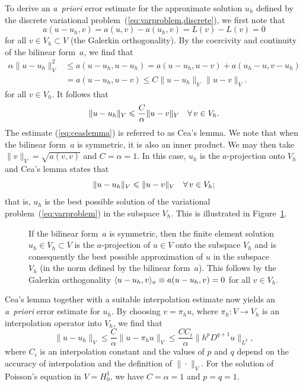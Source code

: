To derive an \emph{a~priori} error estimate for the approximate
solution $u_h$ defined by the discrete variational
problem~(\ref{eq:varproblem,discrete}), we first note that
\begin{equation}
  a(u - u_h, v) = a(u, v) - a(u_h, v) = L(v) - L(v) = 0
\end{equation}
for all $v \in V_h \subset V$ (the Galerkin orthogonality). By the
coercivity and continuity of the bilinear form~$a$, we find that
\begin{equation}
  \begin{split}
    \alpha \|u - u_h\|_V^2
    &\leqslant a(u - u_h, u - u_h)
    = a(u - u_h, u - v) + a(u_h - u, v - u_h)
    \\
    &= a(u - u_h, u - v) \leqslant C \|u - u_h\|_V \, \|u - v\|_V.
  \end{split}
\end{equation}
for all $v \in V_h$. It follows that
\begin{equation} \label{eq:ceaslemma}
  \|u - u_h\|_V
  \leqslant \frac{C}{\alpha} \|u - v\|_V \quad \forall\, v \in V_h.
\end{equation}
%
The estimate (\ref{eq:ceaslemma}) is referred to as Cea's lemma. We
note that when the bilinear form~$a$ is symmetric, it is also an inner
product. We may then take $\|v\|_V = \sqrt{a(v, v)}$ and $C = \alpha =
1$. In this case, $u_h$ is the $a$-projection onto $V_h$ and Cea's
lemma states that
\begin{equation}
  \|u - u_h\|_V \leqslant \|u - v\|_V \quad \forall\, v \in V_h;
\end{equation}
that is, $u_h$ is the best possible solution of the variational
problem~(\ref{eq:varproblem}) in the subspace $V_h$. This is
illustrated in Figure~\ref{fig:ceaslemma}.

\begin{figure}
\bwfig
  \centering
  \caption{If the bilinear form~$a$ is symmetric, then the finite
    element solution~$u_h \in V_h \subset V$ is the $a$-projection
    of $u \in V$ onto the subspace $V_h$ and is consequently the
    best possible approximation of $u$ in the subspace $V_h$ (in the
    norm defined by the bilinear form~$a$). This follows by the Galerkin orthogonality
    $\langle u - u_h, v \rangle_a \equiv a(u - u_h, v) = 0$ for all $v \in V_h$.}
  \label{fig:ceaslemma}
\end{figure}

Cea's lemma together with a suitable interpolation estimate now yields
an \emph{a~priori} error estimate for $u_h$. By choosing $v = \pi_h
u$, where $\pi_h : V \rightarrow V_h$ is an interpolation operator
into $V_h$, we find that
\begin{equation} \label{eq:apriori}
  \|u - u_h\|_V
  \leqslant \frac{C}{\alpha} \|u - \pi_h u\|_V
  \leqslant \frac{C C_i}{\alpha} \|h^p D^{q + 1} u\|_{L^2},
\end{equation}
where $C_i$ is an interpolation constant and the values of $p$ and $q$
depend on the accuracy of interpolation and the definition of
$\|\cdot\|_V$. For the solution of Poisson's equation in $V = H^1_0$,
we have $C = \alpha = 1$ and $p = q = 1$.


